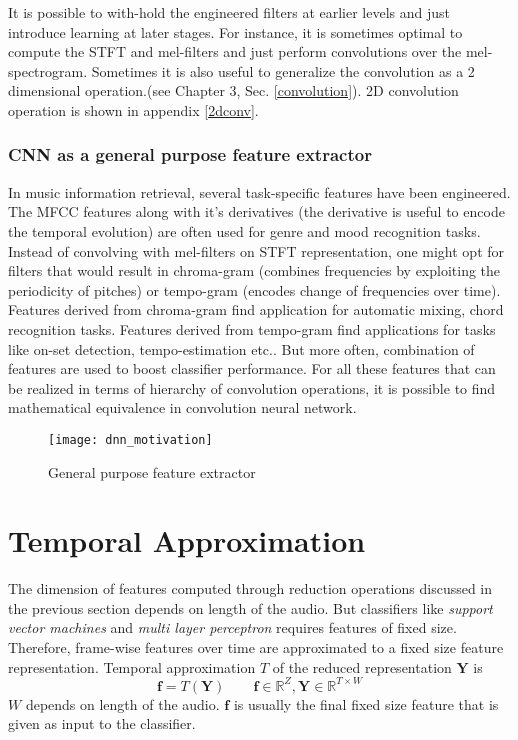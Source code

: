 \FloatBarrier
\noindent It is possible to with-hold the engineered filters at earlier levels and just introduce learning at later stages. For instance, it is sometimes optimal to compute the STFT and mel-filters and just perform convolutions over the mel-spectrogram\cite{EndToEnd}\cite{choi_cnn}. Sometimes it is also useful to generalize the convolution as a 2 dimensional operation\cite{MusicMotive}.(see Chapter 3, Sec. \ref{convolution}). 2D convolution operation is shown in appendix \ref{2dconv}. 

\subsubsection{CNN as a general purpose feature extractor}  
\label{general}
In music information retrieval, several task-specific features have been engineered. The MFCC features along with it's derivatives (the derivative is useful to encode the temporal evolution) are often used for genre and mood recognition tasks. Instead of convolving with mel-filters on STFT representation, one might opt for filters that would result in chroma-gram (combines frequencies by exploiting the periodicity of pitches) or tempo-gram (encodes change of frequencies over time). Features derived from chroma-gram find application for automatic mixing, chord recognition tasks. Features derived from tempo-gram find applications for tasks like on-set detection, tempo-estimation etc.. But more often, combination of features are used to boost classifier performance. For all these features that can be realized in terms of hierarchy of convolution operations, it is possible to find mathematical equivalence in convolution neural network.     

\begin{figure}[h] 
\centering
\texttt{[image: dnn\_motivation]}
\caption{General purpose feature extractor}
 \label{fig:deep learning}
 \end{figure}
\FloatBarrier
\bigskip

\section{Temporal Approximation}
\label{temporal}
The dimension of features computed through reduction operations discussed in the previous section depends on length of the audio. But classifiers like \textit{support vector machines} and \textit{multi layer perceptron} requires features of fixed size. Therefore, frame-wise features over time are approximated to a fixed size feature representation. Temporal approximation $T$ of the reduced representation $\textbf{Y}$ is  
\[
\textbf{f} = T(\textbf{Y}) \qquad \textbf{f} \in \mathbb{R}^{Z}, \textbf{Y} \in \mathbb{R}^{T \times W}
\]
$W$ depends on length of the audio. $\textbf{f}$ is usually the final fixed size feature that is given as input to the classifier.  
\bigskip

